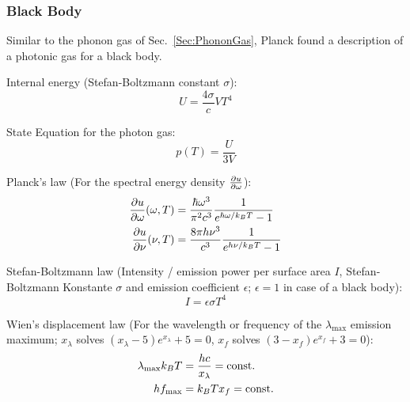 		\subsubsection{Black Body}
			\noindent
			Similar to the phonon gas of Sec.~\ref{Sec:PhononGas}, Planck found a description of a photonic gas for a black body. \vsp

			\noindent
			Internal energy (Stefan-Boltzmann constant $\sigma$):
			\begin{equation}
				U = \frac{4\sigma}{c} V T^4
			\end{equation}

			\noindent
			State Equation for the photon gas:
			\begin{equation}
				p(T) = \frac{U}{3V}
			\end{equation}

			\noindent
			Planck's law (For the spectral energy density $\frac{\partial u}{\partial \omega}$):
			\begin{equation}
				\begin{aligned}
					\frac{\partial u}{\partial \omega}(\omega,T) &= \frac{\hbar \omega^3}{\pi^2 c^3} \frac{1}{e^{\hbar \omega / k_B T} - 1} \\
					\frac{\partial u}{\partial \nu} (\nu, T) &= \frac{8 \pi h \nu^3}{c^3} \frac{1}{e^{h \nu / k_B T} - 1} \\
				\end{aligned}
			\end{equation}

			\noindent
			Stefan-Boltzmann law (Intensity / emission power per surface area $I$, Stefan-Boltzmann Konstante $\sigma$ and emission coefficient $\epsilon$; $\epsilon=1$ in case of a black body):
			\begin{equation}
				I = \epsilon\sigma T^4
			\end{equation}

			\noindent
			Wien's displacement law (For the wavelength or frequency of the $\lambda_{\max}$ emission maximum; $x_\lambda$ solves $(x_\lambda-5)e^{x_\lambda}+5=0$, $x_f$ solves $(3-x_f)e^{x_f}+3=0$):
			\begin{equation}
				\begin{aligned}
					\lambda_{\max} k_B T &= \frac{h c}{x_\lambda} = \mathrm{const.} \\
					h f_{\max} &= k_B T x_f = \mathrm{const.} \\
				\end{aligned}
			\end{equation}

